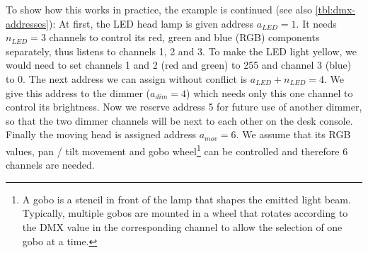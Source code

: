 To show how this works in practice, the example is continued (see also
\cref{tbl:dmx-addresses}): At first, the LED head lamp is given address
\(a_{LED} = 1\). It needs \(n_{LED} = 3\) channels to control its red,
green and blue (RGB) components separately, thus listens to channels 1,
2 and 3. To make the LED light yellow, we would need to set channels 1
and 2 (red and green) to 255 and channel 3 (blue) to 0. The next address
we can assign without conflict is \(a_{LED} + n_{LED} = 4\). We give
this address to the dimmer (\(a_{dim} = 4\)) which needs only this one
channel to control its brightness. Now we reserve address 5 for future
use of another dimmer, so that the two dimmer channels will be next to
each other on the desk console. Finally the moving head is assigned
address \(a_{mov} = 6\). We assume that its RGB values, pan / tilt
movement and gobo wheel\footnote{A gobo is a stencil in front of the
  lamp that shapes the emitted light beam. Typically, multiple gobos are
  mounted in a wheel that rotates according to the DMX value in the
  corresponding channel to allow the selection of one gobo at a time.}
can be controlled and therefore 6 channels are needed.

